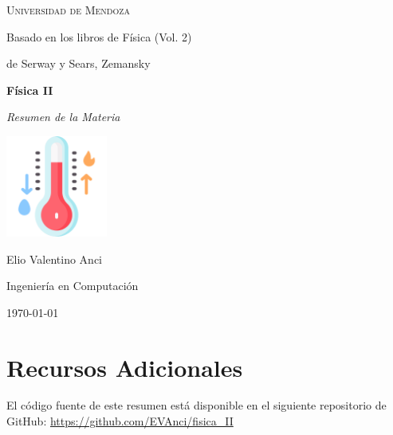 \documentclass[a4paper,12pt]{article}  %
\begin{document}
\begin{titlepage}
  \centering
  \vspace*{2cm} %

  {\scshape\LARGE Universidad de Mendoza\par}
  \vspace{2cm}
  {\large Basado en los libros de Física (Vol. 2)\par}
  {\large de Serway y Sears, Zemansky\par}
  \vspace{1.5cm}

  {\Huge\bfseries Física II\par}
  \vspace{0.5cm}
  {\Large\itshape Resumen de la Materia\par} %

  \vspace{1.5cm}
  \includegraphics[width=0.25\textwidth]{images/cover.png} %
  \vspace{1.5cm}

  {\Large Elio Valentino Anci\par}
  {\large Ingeniería en Computación\par}

  \vfill

  {\large \today\par}
\end{titlepage}

\newpage

\tableofcontents  %

\newpage


\newpage

\newpage

\newpage

\newpage

\newpage

\newpage

\newpage

\newpage

\newpage
\section*{Recursos Adicionales}

El código fuente de este resumen está disponible en el siguiente repositorio de GitHub: \url{https://github.com/EVAnci/fisica_II}
\end{document}

